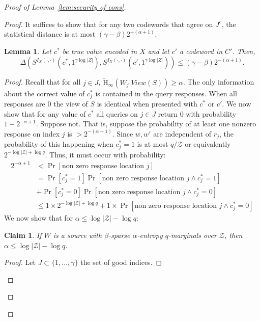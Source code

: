 \documentclass[11pt]{article}
\newtheorem{lemma}[theorem]{Lemma}
\newtheorem{claim}[theorem]{Claim}
\newcommand{\lemref}[1]{\mbox{Lemma~\ref{#1}}}
\newcommand{\Hav}{\tilde{\mathrm{H}}_\infty}
\begin{document}
\begin{proof}[Proof of \lemref{lem:security of cons}]
\begin{proof}
\noindent It suffices to show that for any two codewords that agree on $J^c$, the statistical distance is at most $(\gamma-\beta)2^{-(\alpha+1)}$.
\begin{lemma}
\label{lem:codewords in I close}
Let $c^*$ be true value encoded in $X$ and let $c'$ a codeword in $C'$.  Then,
\[
\Delta( S^{I_X(\cdot, \cdot)}(c^*, 1^{\gamma \log |Z|}), S^{I_X(\cdot, \cdot)}(c', 1^{\gamma \log |Z|})) \le ( \gamma -\beta) 2^{-(\alpha+1)}.
\]
\end{lemma}
\begin{proof}
Recall that for all $j\in J$, $\Hav(W_j | View(S))\geq \alpha$.  The only information about the correct value of $c_j^*$ is contained in the query responses.  When all responses are $0$ the view of $S$ is identical when presented with $c^*$ or $c'$.  We now show that for any value of $c^*$ all queries on $j \in J$ return $0$ with probability $1-2^{-\alpha+1}$.  Suppose not. That is, suppose the probability of at least one nonzero response on index $j$ is $> 2^{-(\alpha+1)}$.  Since $w, w'$ are independent of $r_j$, the probability of this happening when $c^*_j = 1$ is at most $q/\mathcal{Z}$ or  equivalently $2^{-\log |\mathcal{Z}|+\log q}$.  Thus, it must occur with probability:
\begin{align}
2^{-\alpha+1}&<\Pr[\text{non zero response location }j]\nonumber \\
 &= \Pr[c_j^* =1]\Pr[\text{non zero response location }j\wedge c_j^*=1]\nonumber \\&+ \Pr[c_j^*=0] \Pr[\text{non zero response location }j \wedge c_j^*=0]\nonumber \\
&\le 1\times 2^{-\log|\mathcal{Z}|+\log q} + 1\times  \Pr[\text{non zero response location }j \wedge c_j^*=0] \label{eq:ways to remove ent}
\end{align}
We now show that for  $\alpha\leq \log |\mathcal{Z}|-\log q $:
\begin{claim}
\label{cl:ent bounded away from n}
If $W$ is a source with $\beta$-sparse $\alpha$-entropy $q$-marginals over $\mathcal{Z}$, then $\alpha \le \log |\mathcal{Z}|-\log q$.
\end{claim}
\begin{proof}
 Let $J\subset\{1,..., \gamma\}$ the set of good indices.

\end{proof}
\end{proof}
\end{proof}
\end{proof}
\end{document}
